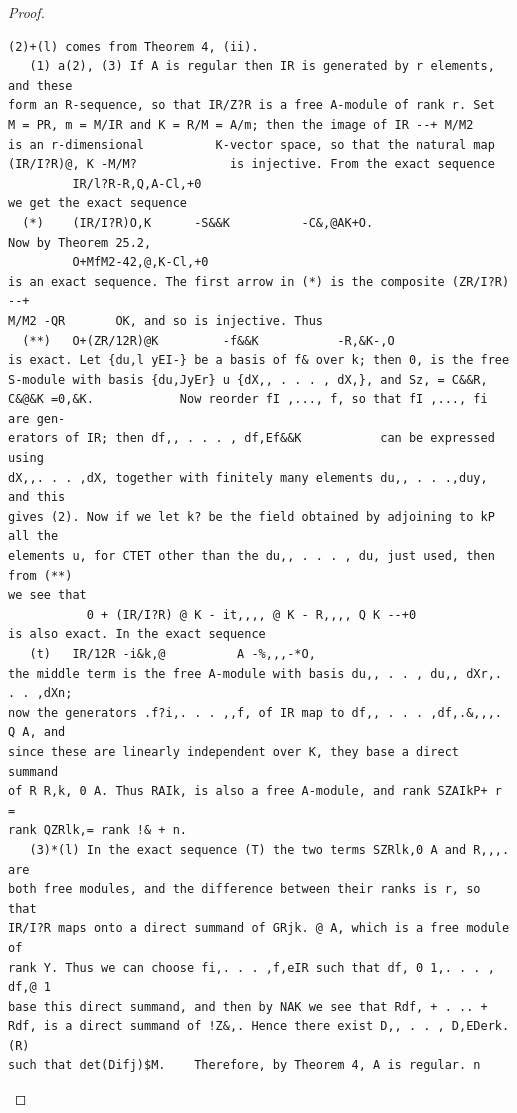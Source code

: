 \begin{proof}
\begin{verbatim}
(2)+(l) comes from Theorem 4, (ii).
   (1) a(2), (3) If A is regular then IR is generated by r elements, and these
form an R-sequence, so that IR/Z?R is a free A-module of rank r. Set
M = PR, m = M/IR and K = R/M = A/m; then the image of IR --+ M/M2
is an r-dimensional          K-vector space, so that the natural map
(IR/I?R)@, K -M/M?             is injective. From the exact sequence
         IR/l?R-R,Q,A-Cl,+0
we get the exact sequence
  (*)    (IR/I?R)O,K      -S&&K          -C&,@AK+O.
Now by Theorem 25.2,
         O+MfM2-42,@,K-Cl,+0
is an exact sequence. The first arrow in (*) is the composite (ZR/I?R) --+
M/M2 -QR       OK, and so is injective. Thus
  (**)   O+(ZR/12R)@K         -f&&K           -R,&K-,O
is exact. Let {du,l yEI-} be a basis of f& over k; then 0, is the free
S-module with basis {du,JyEr} u {dX,, . . . , dX,}, and Sz, = C&&R,
C&@&K =0,&K.            Now reorder fI ,..., f, so that fI ,..., fi are gen-
erators of IR; then df,, . . . , df,Ef&&K           can be expressed using
dX,,. . . ,dX, together with finitely many elements du,, . . .,duy, and this
gives (2). Now if we let k? be the field obtained by adjoining to kP all the
elements u, for CTET other than the du,, . . . , du, just used, then from (**)
we see that
           0 + (IR/I?R) @ K - it,,,, @ K - R,,,, Q K --+0
is also exact. In the exact sequence
   (t)   IR/12R -i&k,@          A -%,,,-*O,
the middle term is the free A-module with basis du,, . . , du,, dXr,. . . ,dXn;
now the generators .f?i,. . . ,,f, of IR map to df,, . . . ,df,.&,,,. Q A, and
since these are linearly independent over K, they base a direct summand
of R R,k, 0 A. Thus RAIk, is also a free A-module, and rank SZAIkP+ r =
rank QZRlk,= rank !& + n.
   (3)*(l) In the exact sequence (T) the two terms SZRlk,0 A and R,,,. are
both free modules, and the difference between their ranks is r, so that
IR/I?R maps onto a direct summand of GRjk. @ A, which is a free module of
rank Y. Thus we can choose fi,. . . ,f,eIR such that df, 0 1,. . . , df,@ 1
base this direct summand, and then by NAK we see that Rdf, + . .. +
Rdf, is a direct summand of !Z&,. Hence there exist D,, . . , D,EDerk.(R)
such that det(Difj)$M.    Therefore, by Theorem 4, A is regular. n
\end{verbatim}
\end{proof}


